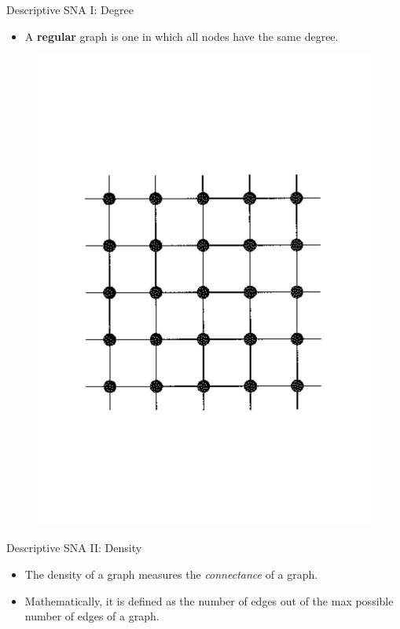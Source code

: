 \documentclass[10pt]{beamer}
\begin{document}
\begin{frame}{Descriptive SNA I: Degree}
	\begin{itemize}
		\item A \textbf{regular} graph is one in which all nodes have the same degree.
	\end{itemize}
\end{frame}

\begin{frame}
	\begin{figure}
	\centering
	\includegraphics[scale=0.5]{Figs/reg}
	\end{figure}
\end{frame}

\begin{frame}{Descriptive SNA II: Density}
	\begin{itemize}
		\item The density of a graph measures the \textit{connectance} of a graph.
		
		\item Mathematically, it is defined as the number of edges out of the max possible number of edges of a graph.
	\end{itemize}
\end{frame}
\end{document}

